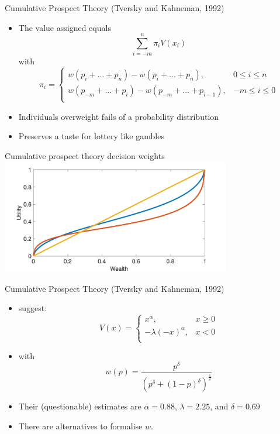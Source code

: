\begin{frame}{Cumulative Prospect Theory (Tversky and Kahneman, 1992)}
    \begin{itemize}
       \item The value assigned equals
        \[ \sum_{i=-m}^{n} \pi_i V(x_i)\]
        with\\
            \begin{equation}
                \pi_i = \begin{cases}
                w(p_i+...+p_n) - w(p_i+...+p_n),  & 0\leq i \leq  n\\
                w(p_{-m}+...+p_i) - w(p_{-m}+...+p_{i-1}),  & -m\leq i \leq 0\\
            \end{cases}
            \end{equation}\medskip
        \item Individuals overweight fails of a probability distribution\medskip
        \item Preserves a taste for lottery like gambles\medskip
    \end{itemize}
\end{frame}

\begin{frame}{Cumulative prospect theory decision weights}
\centering
\includegraphics[width= 0.75\textwidth]{cpt_weights}
\end{frame}

\begin{frame}{Cumulative Prospect Theory (Tversky and Kahneman, 1992)}
    \begin{itemize}
        \item \citet{TverskyKahneman1992} suggest:
\begin{equation}
    V(x) = \begin{cases}
    x^\alpha,  & x\geq 0\\
    -\lambda (-x)^\alpha,  & x< 0\\
    \end{cases}
\end{equation}\medskip
\item with \[w(p) = \frac{p^{\delta}}{(p^{\delta}+(1-p)^{\delta})^{\frac{1}{\delta}}}\]
\item Their (questionable) estimates are $\alpha =0.88$, $\lambda =2.25$, and  $\delta =0.69$\medskip
    \item There are alternatives to formalise $w$.
\end{itemize}
\end{frame}


